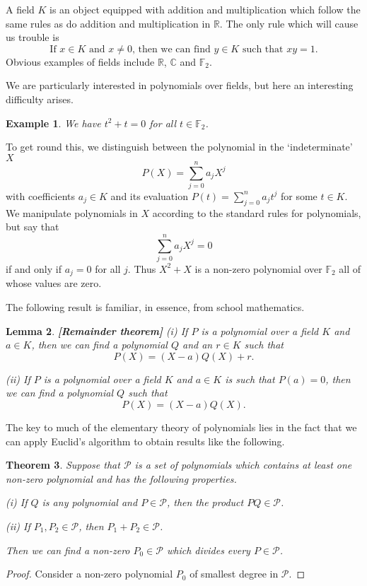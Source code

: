 \documentclass[12pt,a4paper]{article}
\theoremstyle{plain}
\newtheorem{theorem}{Theorem}[section]
\newtheorem{lemma}[theorem]{Lemma}
\newtheorem{example}[theorem]{Example}
\theoremstyle{definition}
\begin{document}
    A field $K$ is an object equipped with addition
    and multiplication which follow the same rules
    as do addition and multiplication in ${\mathbb R}$.
    The only rule which will cause us trouble
    is
    \begin{equation*}
        \text{If $x\in K$ and $x\neq 0$, then we can find
        $y\in K$ such that $xy=1$.}\tag*{$\bigstar$}
    \end{equation*}
    Obvious examples of fields include ${\mathbb R}$, ${\mathbb C}$
    and ${\mathbb F}_{2}$.

    We are particularly interested in polynomials over
    fields, but here an interesting difficulty arises.
    \begin{example}
        We have $t^{2}+t=0$ for all $t\in{\mathbb F}_{2}$.
    \end{example}
    To get round this, we distinguish between the
    polynomial in the `indeterminate' $X$
    \[P(X)=\sum_{j=0}^{n}a_{j}X^{j}\]
    with coefficients $a_{j}\in K$ and its
    evaluation $P(t)=\sum_{j=0}^{n}a_{j}t^{j}$
    for some $t\in K$. We manipulate polynomials in $X$
    according to the standard rules for polynomials,
    but say that
    \[\sum_{j=0}^{n}a_{j}X^{j}=0\]
    if and only if $a_{j}=0$ for all $j$.
    Thus $X^{2}+X$ is a non-zero polynomial
    over ${\mathbb F}_{2}$ all of whose values are zero.

    The following result is familiar, in essence,
    from school mathematics.
    \begin{lemma}{\bf [Remainder theorem]}
        \label{remainder}
        (i) If $P$ is a polynomial over a field $K$
        and $a\in K$, then we can find a polynomial $Q$ and an
        $r\in K$ such that
        \[P(X)=(X-a)Q(X)+r.\]

        (ii) If $P$ is a polynomial over a field $K$
        and $a\in K$ is such that $P(a)=0$, then
        we can find a polynomial $Q$ such that
        \[P(X)=(X-a)Q(X).\]
    \end{lemma}

    The key to much of the elementary theory of
    polynomials lies in the fact that we can apply
    Euclid's algorithm to obtain results like the
    following.
    \begin{theorem}
        \label{greatest common}
        Suppose that $\mathcal{P}$ is a
        set of polynomials which contains at least one
        non-zero polynomial and has the following properties.

        (i) If $Q$ is any polynomial and $P\in\mathcal{P}$,
        then the product $PQ\in\mathcal{P}$.

        (ii) If $P_{1},P_{2}\in \mathcal{P}$,
        then $P_{1}+P_{2}\in \mathcal{P}$.

        Then we can find a non-zero $P_{0}\in\mathcal{P}$ which
        divides every $P\in\mathcal{P}$.
    \end{theorem}
    \begin{proof}
        Consider a non-zero polynomial $P_{0}$
        of smallest degree in ${\mathcal P}$.
    \end{proof}
\end{document}

